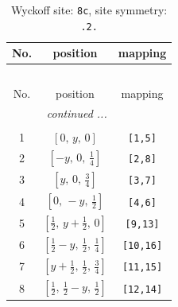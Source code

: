 \documentclass[fleqn,8pt]{jsarticle}
\begin{document}
\begin{longtable}{ccc}
\caption{Wyckoff site: {\tt 8c}, site symmetry: {\tt .2.}}
 \\
 \hline \hline
No. & position & mapping \\ \hline \endfirsthead

\multicolumn{2}{l}{\tablename\ \thetable{}} \\
 \hline \hline
No. & position & mapping \\ \hline \endhead

 \hline \hline
\multicolumn{2}{r}{\footnotesize\it continued ...} \\ \endfoot

 \hline \hline
\multicolumn{2}{r}{} \\ \endlastfoot

1 & $\left[ 0,\, y,\, 0 \right]$ & {\tt [1,5]} \\ \hline
2 & $\left[ - y,\, 0,\, \frac{1}{4} \right]$ & {\tt [2,8]} \\ \hline
3 & $\left[ y,\, 0,\, \frac{3}{4} \right]$ & {\tt [3,7]} \\ \hline
4 & $\left[ 0,\, - y,\, \frac{1}{2} \right]$ & {\tt [4,6]} \\ \hline
5 & $\left[ \frac{1}{2},\, y + \frac{1}{2},\, 0 \right]$ & {\tt [9,13]} \\ \hline
6 & $\left[ \frac{1}{2} - y,\, \frac{1}{2},\, \frac{1}{4} \right]$ & {\tt [10,16]} \\ \hline
7 & $\left[ y + \frac{1}{2},\, \frac{1}{2},\, \frac{3}{4} \right]$ & {\tt [11,15]} \\ \hline
8 & $\left[ \frac{1}{2},\, \frac{1}{2} - y,\, \frac{1}{2} \right]$ & {\tt [12,14]} \\
\end{longtable}
\renewcommand{\arraystretch}{1.2}
\end{document}
